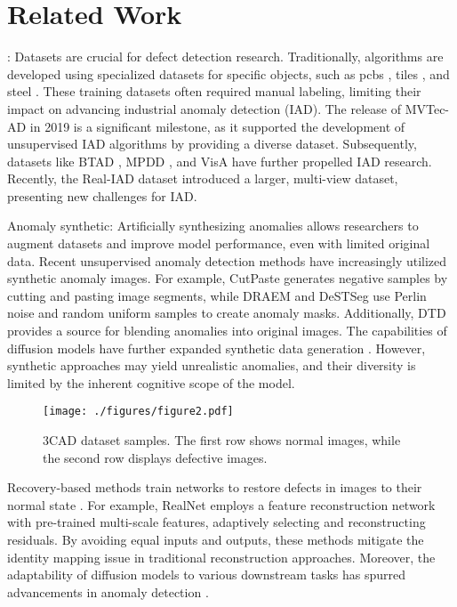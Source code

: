 \section{Related Work}
: Datasets are crucial for defect detection research. Traditionally, algorithms are developed using specialized datasets for specific objects, such as pcbs \cite{(15)tang2019online}, tiles \cite{(16)huang2020surface}, and steel \cite{(17)he2019end}. These training datasets often required manual labeling, limiting their impact on advancing industrial anomaly detection (IAD). The release of MVTec-AD in 2019 is a significant milestone, as it supported the development of unsupervised IAD algorithms by providing a diverse dataset. Subsequently, datasets like BTAD \cite{(18)mishra2021vt}, MPDD \cite{(19)jezek2021deep}, and VisA \cite{(12)zou2022spot} have further propelled IAD research. Recently, the Real-IAD \cite{(14)wang2024real} dataset introduced a larger, multi-view dataset, presenting new challenges for IAD. %

Anomaly synthetic: Artificially synthesizing anomalies allows researchers to augment datasets and improve model performance, even with limited original data. Recent unsupervised anomaly detection methods have increasingly utilized synthetic anomaly images. For example, CutPaste \cite{(21)li2021cutpaste} generates negative samples by cutting and pasting image segments, while DRAEM \cite{(22)zavrtanik2021draem} and DeSTSeg \cite{(23)zhang2023destseg} use Perlin noise and random uniform samples to create anomaly masks. Additionally, DTD \cite{(24)cimpoi2014describing} provides a source for blending anomalies into original images. The capabilities of diffusion models have further expanded synthetic data generation \cite{(25)hu2024anomalydiffusion, (26)zhang2024realnet}. However, synthetic approaches may yield unrealistic anomalies, and their diversity is limited by the inherent cognitive scope of the model.


\begin{figure*}[t]
    \centering
    \texttt{[image: ./figures/figure2.pdf]}
    \caption{3CAD dataset samples. The first row shows normal images, while the second row displays defective images.}
\label{fig2}
\end{figure*}


Recovery-based methods train networks to restore defects in images to their normal state \cite{(27)zavrtanik2021reconstruction, (28)xing2023visual,(44)xing2024recover}. For example, RealNet \cite{(26)zhang2024realnet} employs a feature reconstruction network with pre-trained multi-scale features, adaptively selecting and reconstructing residuals. By avoiding equal inputs and outputs, these methods mitigate the identity mapping issue in traditional reconstruction approaches. Moreover, the adaptability of diffusion models to various downstream tasks has spurred advancements in anomaly detection \cite{(42)shen2023advancing,(43)he2024diffusion}.

